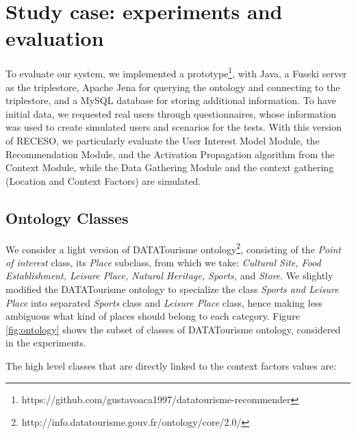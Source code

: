 \vspace{-0.2cm}
\section{Study case: experiments and evaluation} \label{section:study-case}

To evaluate our system,  we 
implemented a prototype\footnote{https://github.com/gustavoaca1997/datatourisme-recommender}, with Java, 
a Fuseki server as the triplestore, Apache Jena for querying 
the ontology and connecting to the triplestore, and a MySQL database for storing additional information.
To have initial data, we requested real users through questionnaires, whose information was used to  create simulated users and scenarios for the tests.
With this version of RECESO, we 
particularly evaluate
the User Interest Model Module, the Recommendation Module, and the Activation Propagation algorithm from the Context Module, while the Data Gathering Module and the context gathering (Location and Context Factors) are simulated.


\vspace{-0.2cm}
\subsection{Ontology Classes}
We consider a light version of DATATourisme ontology\footnote{http://info.datatourisme.gouv.fr/ontology/core/2.0/}, consisting of the \textit{Point of interest} class, its \textit{Place} subclass, from which we take: \textit{Cultural Site, Food Establishment, Leisure Place, Natural Heritage, Sports,} and \textit{Store}.  We slightly modified the DATATourisme ontology to specialize the class \textit{Sports and Leisure Place} into separated  \textit{Sports} class and \textit{Leisure Place} class, hence making less ambiguous what kind of places should belong to each category. Figure \ref{fig:ontology} shows the subset of classes of DATATourisme ontology, considered  in the experiments.

The high level classes that are directly linked to the context factors values are:

